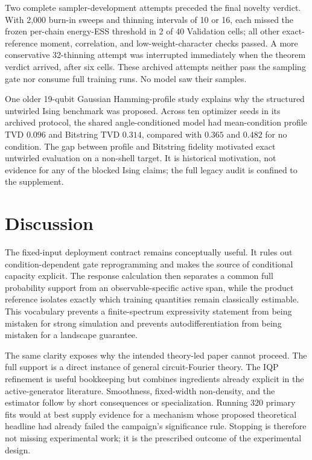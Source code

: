 \documentclass[a4paper,twocolumn,11pt,unpublished]{quantumarticle}
\begin{document}
Two complete sampler-development attempts preceded the final novelty verdict.
With 2,000 burn-in sweeps and thinning intervals of 10 or 16, each missed the
frozen per-chain energy-ESS threshold in 2 of 40 Validation cells; all other
exact-reference moment, correlation, and low-weight-character checks passed.
A more conservative 32-thinning attempt was interrupted immediately when the
theorem verdict arrived, after six cells.  These archived attempts neither
pass the sampling gate nor consume full training runs.  No model saw their
samples.

One older 19-qubit Gaussian Hamming-profile study explains why the structured
untwirled Ising benchmark was proposed.  Across ten optimizer seeds in its
archived protocol, the shared angle-conditioned model had mean-condition
profile TVD $0.096$ and Bitstring TVD $0.314$, compared with $0.365$ and
$0.482$ for no condition.  The gap between profile and Bitstring fidelity
motivated exact untwirled evaluation on a non-shell target.  It is historical
motivation, not evidence for any of the blocked Ising claims; the full legacy
audit is confined to the supplement.

\section{Discussion}

The fixed-input deployment contract remains conceptually useful.  It rules out
condition-dependent gate reprogramming and makes the source of conditional
capacity explicit.  The response calculation then separates a common full
probability support from an observable-specific active span, while the product
reference isolates exactly which training quantities remain classically
estimable.  This vocabulary prevents a finite-spectrum expressivity statement
from being mistaken for strong simulation and prevents autodifferentiation
from being mistaken for a landscape guarantee.

The same clarity exposes why the intended theory-led paper cannot proceed.
The full support is a direct instance of general circuit-Fourier theory.  The
IQP refinement is useful bookkeeping but combines ingredients already explicit
in the active-generator literature.  Smoothness, fixed-width non-density, and
the estimator follow by short consequences or specialization.  Running 320
primary fits would at best supply evidence for a mechanism whose proposed
theoretical headline had already failed the campaign's significance rule.
Stopping is therefore not missing experimental work; it is the prescribed
outcome of the experimental design.
\end{document}

